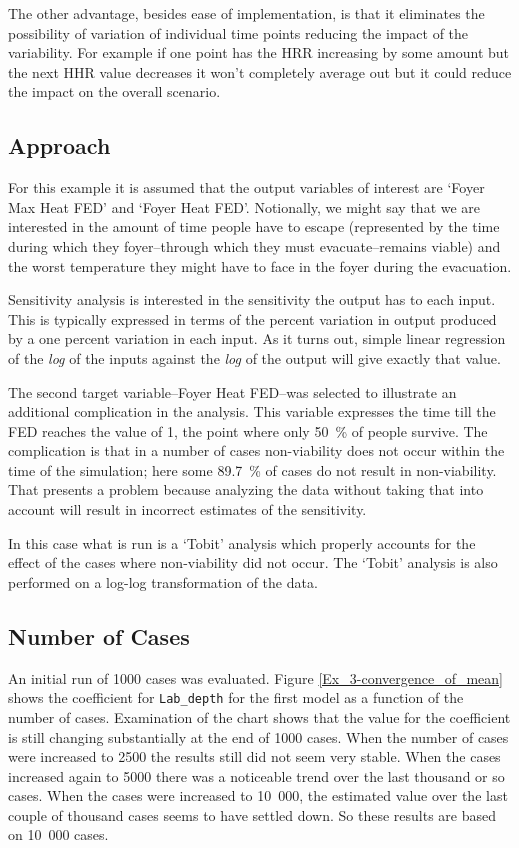 \documentclass[12pt,twoside]{book}
\begin{document}
The other advantage, besides ease of implementation, is that it eliminates the possibility of variation of individual time points reducing the impact of the variability. For example if one point has the HRR increasing by some amount but the next HHR value decreases it won't completely average out but it could reduce the impact on the overall scenario.

\hypertarget{approach}{%
\subsection{Approach}\label{approach}}

For this example it is assumed that the output variables of interest are `Foyer Max Heat FED' and `Foyer Heat FED'. Notionally, we might say that we are interested in the amount of time people have to escape (represented by the time during which they foyer--through which they must evacuate--remains viable) and the worst temperature they might have to face in the foyer during the evacuation.

Sensitivity analysis is interested in the sensitivity the output has to each input. This is typically expressed in terms of the percent variation in output produced by a one percent variation in each input. As it turns out, simple linear regression of the \emph{log} of the inputs against the \emph{log} of the output will give exactly that value.

The second target variable--Foyer Heat FED--was selected to illustrate an additional complication in the analysis. This variable expresses the time till the FED reaches the value of 1, the point where only 50~\% of people survive. The complication is that in a number of cases non-viability does not occur within the time of the simulation; here some 89.7~\% of cases do not result in non-viability. That presents a problem because analyzing the data without taking that into account will result in incorrect estimates of the sensitivity.

In this case what is run is a `Tobit' analysis\cite{Tobin:1958} which properly accounts for the effect of the cases where non-viability did not occur. The `Tobit' analysis is also performed on a log-log transformation of the data.


\subsection{Number of Cases}\label{number-of-cases_3}

An initial run of 1000 cases was evaluated. Figure \ref{Ex_3-convergence_of_mean} shows the coefficient for \texttt{Lab\_depth} for the first model as a function of the number of cases. Examination of the chart shows that the value for the coefficient is still changing substantially at the end of 1000 cases. When the number of cases were increased to 2500 the results still did not seem very stable. When the cases increased again to 5000 there was a noticeable trend over the last thousand or so cases. When the cases were increased to 10~000, the estimated value over the last couple of thousand cases seems to have settled down. So these results are based on 10~000 cases.
\end{document}
